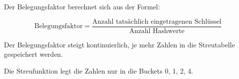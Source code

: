 \documentclass{bschlangaul-aufgabe}
\begin{document}
\begin{enumerate}
\begin{bAntwort}
Der Belegungsfaktor berechnet sich aus der Formel:

\begin{displaymath}
\text{Belegungsfaktor} =
\frac{\text{Anzahl tatsächlich eingetragenen Schlüssel}}
{\text{Anzahl Hashwerte}}
\end{displaymath}

Der Belegungsfaktor steigt kontinuierlich, je mehr Zahlen in die
Streutabelle gespeichert werden.

Die Streufunktion legt die Zahlen nur in die Buckets 0, 1, 2, 4.
\end{bAntwort}

\end{enumerate}
\end{document}
